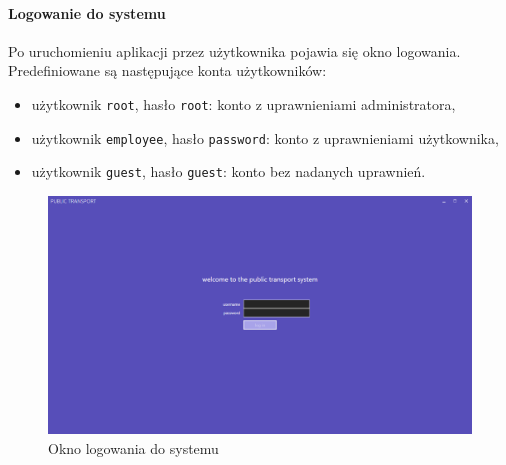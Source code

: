 \documentclass[10pt,a4paper]{article}
\begin{document}
\paragraph{Logowanie do systemu}
Po uruchomieniu aplikacji przez użytkownika pojawia się okno logowania. Predefiniowane są następujące konta użytkowników:
\begin{itemize}
	\item użytkownik \texttt{root}, hasło \texttt{root}: konto z uprawnieniami administratora,
	\item użytkownik \texttt{employee}, hasło \texttt{password}: konto z uprawnieniami użytkownika,
	\item użytkownik \texttt{guest}, hasło \texttt{guest}: konto bez nadanych uprawnień.
\end{itemize}
\begin{figure}[H]
	\centering
	\includegraphics[width=15cm]{Resources/Images/01_login_screen.png}
	\caption{Okno logowania do systemu}
\end{figure}
\end{document}
